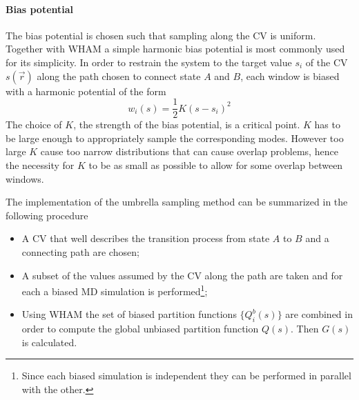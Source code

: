 \paragraph{\textbf{Bias potential}} The bias potential is chosen such that sampling along the \ac{CV} is uniform.
Together with \ac{WHAM} a simple harmonic bias potential is most commonly used for its simplicity. In order to
restrain the system to the target value $s_i$ of the \ac{CV} $s(\vec r)$ along the path chosen to connect state
$A$ and $B$, each window is biased with a harmonic potential of the form
\begin{equation*}
	w_i(s) = \frac{1}{2}K (s - s_i)^2
\end{equation*}
The choice of $K$, the strength of the bias potential, is a critical point. $K$ has to be large enough to
appropriately sample the corresponding modes. However too large $K$ cause too narrow distributions that can cause
overlap problems, hence the necessity for $K$ to be as small as possible to allow for some overlap between
windows.


\bigskip The implementation of the umbrella sampling method can be summarized in the following procedure
\begin{itemize}
	\item A \ac{CV} that well describes the transition process from state $A$ to $B$ and a connecting path are chosen;
	\item A subset of the values assumed by the \ac{CV} along the path are taken and for each a biased \ac{MD} simulation is performed\footnote{Since each biased simulation is independent they can be performed in parallel with the other.};
	\item Using \ac{WHAM} the set of biased partition functions $\{Q^b_i(s)\}$ are combined in order to compute the global unbiased partition function $Q(s)$. Then $G(s)$ is calculated.
\end{itemize}


